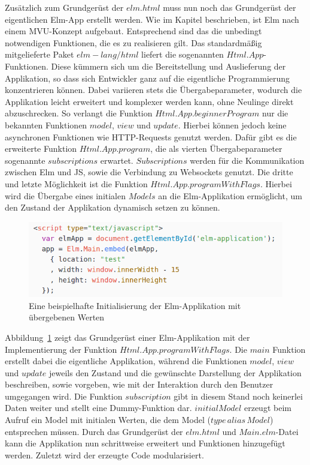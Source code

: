 Zusätzlich zum Grundgerüst der $elm.html$ muss nun noch das Grundgerüst der eigentlichen Elm-App erstellt werden. Wie im Kapitel  beschrieben, ist Elm nach einem \ac{MVU}-Konzept aufgebaut. Entsprechend sind das die unbedingt notwendigen Funktionen, die es zu realisieren gilt. Das standardmäßig mitgelieferte Paket $elm-lang/html$ liefert die sogenannten $Html.App$-Funktionen. Diese kümmern sich um die Bereitstellung und Auslieferung der Applikation, so dass sich Entwickler ganz auf die eigentliche Programmierung konzentrieren können. Dabei variieren stets die Übergabeparameter, wodurch die Applikation leicht erweitert und komplexer werden kann, ohne Neulinge direkt abzuschrecken. So verlangt die Funktion $Html.App.beginnerProgram$ nur die bekannten Funktionen $model$, $view$ und $update$. Hierbei können jedoch keine asynchronen Funktionen wie \ac{HTTP}-Requests genutzt werden.
Dafür gibt es die erweiterte Funktion $Html.App.program$, die als vierten Übergabeparameter sogenannte $subscriptions$ erwartet. $Subscriptions$ werden für die Kommunikation zwischen Elm und \ac{JS}, sowie die Verbindung zu Websockets genutzt.
Die dritte und letzte Möglichkeit ist die Funktion $Html.App.programWithFlags$. Hierbei wird die Übergabe eines initialen $Models$ an die Elm-Applikation ermöglicht, um den Zustand der Applikation dynamisch setzen zu können.
\begin{figure}[ht]
\centering\includegraphics[scale=0.6]{img/programWithFlags_pass_data.png}
\caption{Eine beispielhafte Initialisierung der Elm-Applikation mit übergebenen Werten}\label{fig:programWithFlags}
\end{figure}
Abbildung~\ref{fig:programWithFlags} zeigt das Grundgerüst einer Elm-Applikation mit der Implementierung der Funktion $Html.App.programWithFlags$. Die $main$ Funktion erstellt dabei die eigentliche Applikation, während die Funktionen $model$, $view$ und $update$ jeweils den Zustand und die gewünschte Darstellung der Applikation beschreiben, sowie vorgeben, wie mit der Interaktion durch den Benutzer umgegangen wird. Die Funktion $subscription$ gibt in diesem Stand noch keinerlei Daten weiter und stellt eine Dummy-Funktion dar. $initialModel$ erzeugt beim Aufruf ein Model mit initialen Werten, die dem Model ($type\,alias\,Model$) entsprechen müssen. Durch das Grundgerüst der $elm.html$ und $Main.elm$-Datei kann die Applikation nun schrittweise erweitert und Funktionen hinzugefügt werden. Zuletzt wird der erzeugte Code modularisiert.

